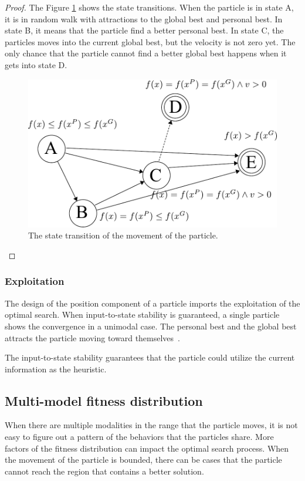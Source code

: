 \begin{mythm}
\begin{proof}
The Figure \ref{fig:fsm} shows the state transitions.
When the particle is in state A, it is in random walk with attractions to the global best and personal best.
In state B, it means that the particle find a better personal best.
In state C, the particles moves into the current global best, but the velocity is not zero yet.
The only chance that the particle cannot find a better global best happens when it gets into state D.

\begin{figure}[tbph]
\centering
\includegraphics[width=0.7\linewidth]{./fig/fsm}
\caption{The state transition of the movement of the particle.}
\label{fig:fsm}
\end{figure}

\end{proof}
\end{mythm}

\subsubsection{Exploitation}

The design of the position component of a particle imports the exploitation of the optimal search.
When input-to-state stability is guaranteed, a single particle shows the convergence in a unimodal case.
The personal best and the global best attracts the particle moving toward themselves~\cite{Schmitt:2013:PSO:2463372.2463563}.

The input-to-state stability guarantees that the particle could utilize the current information as the heuristic.


\subsection{Multi-model fitness distribution}

When there are multiple modalities in the range that the particle moves, it is not easy to figure out a pattern of the behaviors that the particles share.
More factors of the fitness distribution can impact the optimal search process.
When the movement of the particle is bounded, there can be cases that the particle cannot reach the region that contains a better solution.

